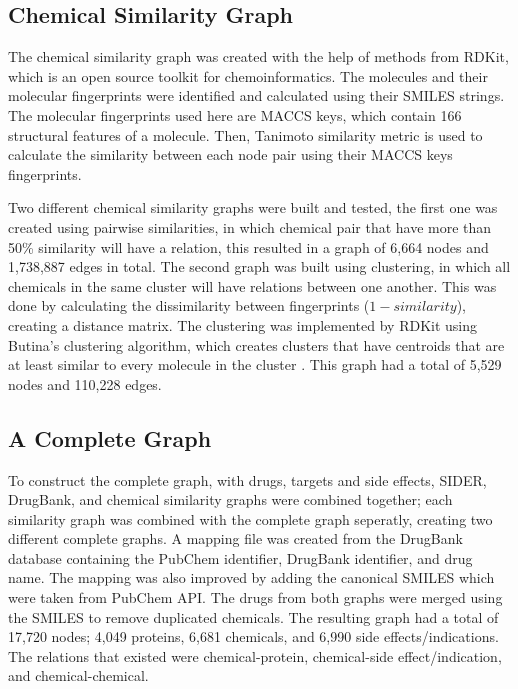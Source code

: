 \subsection{Chemical Similarity Graph}

The chemical similarity graph was created with the help of methods from RDKit, which is an open source toolkit for chemoinformatics.
The molecules and their molecular fingerprints were identified and calculated using their \ac{SMILES} strings.
The molecular fingerprints used here are MACCS keys, which contain 166 structural features of a molecule.
Then, Tanimoto similarity metric is used to calculate the similarity between each node pair using their MACCS keys fingerprints.

Two different chemical similarity graphs were built and tested, the first one was created using pairwise similarities, in which chemical pair that have more than 50\% similarity will have a relation, this resulted in a graph of 6,664 nodes and 1,738,887 edges in total.
The second graph was built using clustering, in which all chemicals in the same cluster will have relations between one another.
This was done by calculating the dissimilarity between fingerprints ($1 - similarity$), creating a distance matrix.
The clustering was implemented by RDKit using Butina's clustering algorithm, which creates clusters that have centroids that are at least similar to every molecule in the cluster \cite{butina_unsupervised_1999}.
This graph had a total of 5,529 nodes and 110,228 edges.

\subsection{A Complete Graph}

To construct the complete graph, with drugs, targets and side effects, \ac{SIDER}, DrugBank, and chemical similarity graphs were combined together; each similarity graph was combined with the complete graph seperatly, creating two different complete graphs.
A mapping file was created from the DrugBank database containing the PubChem identifier, DrugBank identifier, and drug name.
The mapping was also improved by adding the canonical \ac{SMILES} which were taken from PubChem API.
The drugs from both graphs were merged using the SMILES to remove duplicated chemicals.
The resulting graph had a total of 17,720 nodes; 4,049 proteins, 6,681 chemicals, and 6,990 side effects/indications.
The relations that existed were chemical-protein, chemical-side effect/indication, and chemical-chemical.

